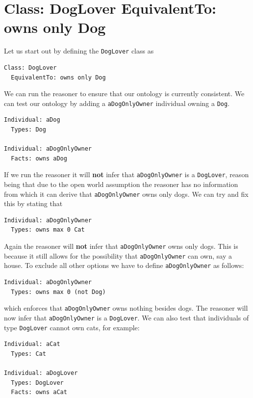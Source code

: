 \documentclass{amsart}
\begin{document}
  \section{Class: DogLover EquivalentTo: owns only Dog}
  Let us start out by defining the \texttt{DogLover} class as 
\begin{small}
\begin{verbatim} 
Class: DogLover
  EquivalentTo: owns only Dog
\end{verbatim}
\end{small}    
We can run the reasoner to ensure that our ontology is currently consistent. We can test our ontology by adding a \texttt{aDogOnlyOwner} individual owning a \texttt{Dog}. 
\begin{small}
\begin{verbatim} 
Individual: aDog
  Types: Dog

Individual: aDogOnlyOwner
  Facts: owns aDog
\end{verbatim}
\end{small}
If we run the reasoner it will \textbf{not} infer that \texttt{aDogOnlyOwner} is a \texttt{DogLover}, reason being that due to the open world assumption the reasoner has no information from which it can derive that \texttt{aDogOnlyOwner} owns only dogs. We can try and fix this by stating that
\begin{small}
\begin{verbatim} 
Individual: aDogOnlyOwner
  Types: owns max 0 Cat
\end{verbatim}
\end{small}
Again the reasoner will \textbf{not} infer that \texttt{aDogOnlyOwner} owns only dogs. This is because it still allows for the possibility that \texttt{aDogOnlyOwner} can own, say a house. To exclude all other options we have to define \texttt{aDogOnlyOwner} as follows:
\begin{small}
\begin{verbatim} 
Individual: aDogOnlyOwner
  Types: owns max 0 (not Dog)
\end{verbatim}
\end{small}
which enforces that \texttt{aDogOnlyOwner} owns nothing besides dogs. The reasoner will now infer that \texttt{aDogOnlyOwner} is a \texttt{DogLover}. We can also test that individuals of type \texttt{DogLover} cannot own cats, for example:
\begin{small}
\begin{verbatim} 
Individual: aCat
  Types: Cat
  
Individual: aDogLover
  Types: DogLover
  Facts: owns aCat
\end{verbatim}
\end{small}
\end{document}
